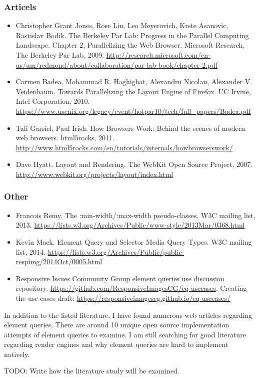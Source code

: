 \documentclass[oneside,a4paper,11pt]{kth-mag}
\begin{document}
\subsubsection*{Articels}
\begin{itemize}
\item Christopher Grant Jones, Rose Liu, Leo Meyerovich, Krste Asanovic, Rastislav Bodik. The Berkeley Par Lab: Progress in the Parallel Computing Landscape. Chapter 2, Parallelizing the Web Browser. Microsoft Research, The Berkeley Par Lab, 2009. \url{http://research.microsoft.com/en-us/um/redmond/about/collaboration/par-lab-book/chapter-2.pdf}
\item Carmen Badea, Mohammad R. Haghighat, Alexandru Nicolau, Alexander V. Veidenbaum. Towards Parallelizing the Layout Engine of Firefox. UC Irvine, Intel Corporation, 2010. \url{https://www.usenix.org/legacy/event/hotpar10/tech/full_papers/Badea.pdf}
\item Tali Garsiel, Paul Irish. How Browsers Work: Behind the scenes of modern web browsers. html5rocks, 2011. \url{http://www.html5rocks.com/en/tutorials/internals/howbrowserswork/}
\item Dave Hyatt. Layout and Rendering. The WebKit Open Source Project, 2007. \url{http://www.webkit.org/projects/layout/index.html}
\end{itemize}

\subsubsection{Other}
\begin{itemize}
\item Francois Remy. The :min-width/:max-width pseudo-classes. W3C mailing list, 2013. \url{https://lists.w3.org/Archives/Public/www-style/2013Mar/0368.html}
\item Kevin Mack. Element Query and Selector Media Query Types. W3C mailing list, 2014. \url{https://lists.w3.org/Archives/Public/public-respimg/2014Oct/0005.html}
\item Responsive Issues Community Group element queries use discussion repository. \url{https://github.com/ResponsiveImagesCG/eq-usecases}. Creating the use cases draft: \url{https://responsiveimagescg.github.io/eq-usecases/}
\end{itemize}

In addition to the listed literature, I have found numerous web articles regarding element queries. There are around 10 unique open source implementation attempts of element queries to examine. I am still searching for good literature regarding render engines and why element queries are hard to implement natively.

TODO: Write how the literature study will be examined.
\end{document}
